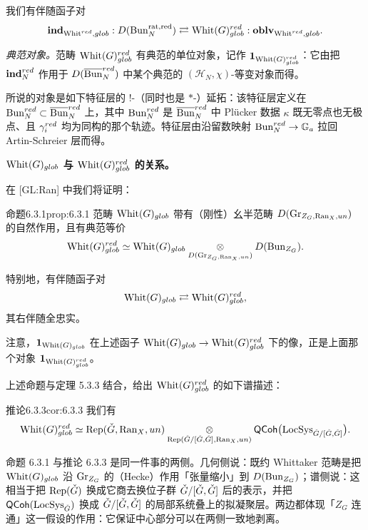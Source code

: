 我们有伴随函子对
\[
  \mathbf{ind}_{\mathrm{Whit}^{red},glob} : D(\operatorname{Bun}^{\mathrm{rat},\mathrm{red}}_N)
  \rightleftarrows \mathrm{Whit}(G)^{red}_{glob} : \mathbf{oblv}_{\mathrm{Whit}^{red},glob}.
\]

\emph{典范对象。}范畴 $\mathrm{Whit}(G)^{red}_{glob}$ 有典范的单位对象，记作 $\mathbf{1}_{\mathrm{Whit}(G)^{red}_{glob}}$：它由把 $\mathbf{ind}^{red}_N$ 作用于 $D(\overline{\operatorname{Bun}}^{red}_N)$ 中某个典范的 $(\mathcal H_N,\chi)$-等变对象而得。

所说的对象是如下特征层的 $!$-（同时也是 $\ast$-）延拓：该特征层定义在 $\operatorname{Bun}^{red}_N\subset\overline{\operatorname{Bun}}^{red}_N$ 上，其中 $\operatorname{Bun}^{red}_N$ 是 $\overline{\operatorname{Bun}}^{red}_N$ 中 Plücker 数据 $\kappa$ 既无零点也无极点、且 $\gamma_i^{red}$ 均为同构的那个轨迹。特征层由沿留数映射 $\operatorname{Bun}^{red}_N\to\mathbb{G}_a$ 拉回 Artin-Schreier 层而得。

\textbf{$\mathrm{Whit}(G)_{glob}$ 与 $\mathrm{Whit}(G)^{red}_{glob}$ 的关系。}

在 [GL:Ran] 中我们将证明：

\begin{othm}{命题}{6.3.1}{prop:6.3.1}
范畴 $\mathrm{Whit}(G)_{glob}$ 带有（刚性）幺半范畴 $D(\operatorname{Gr}_{Z_G,\mathrm{Ran}_X,un})$ 的自然作用，且有典范等价
\[
  \mathrm{Whit}(G)^{red}_{glob}\simeq
  \mathrm{Whit}(G)_{glob}\underset{D(\operatorname{Gr}_{Z_G,\mathrm{Ran}_X,un})}{\otimes} D(\operatorname{Bun}_{Z_G}).
\]
\end{othm}

特别地，有伴随函子对
\[
  \mathrm{Whit}(G)_{glob}\rightleftarrows\mathrm{Whit}(G)^{red}_{glob},
\]
其右伴随全忠实。

注意，$\mathbf{1}_{\mathrm{Whit}(G)_{glob}}$ 在上述函子 $\mathrm{Whit}(G)_{glob}\to\mathrm{Whit}(G)^{red}_{glob}$ 下的像，正是上面那个对象 $\mathbf{1}_{\mathrm{Whit}(G)^{red}_{glob}}$。

上述命题与定理 5.3.3 结合，给出 $\mathrm{Whit}(G)^{red}_{glob}$ 的如下谱描述：

\begin{othm}{推论}{6.3.3}{cor:6.3.3}
我们有
\[
  \mathrm{Whit}(G)^{red}_{glob}\simeq
  \operatorname{Rep}(\check G,\mathrm{Ran}_X,un)
  \underset{\operatorname{Rep}(\check G/[\check G,\check G],\mathrm{Ran}_X,un)}{\otimes}
  \mathsf{QCoh}\bigl(\operatorname{LocSys}_{\check G/[\check G,\check G]}\bigr).
\]
\end{othm}

\begin{annote}
命题 6.3.1 与推论 6.3.3 是同一件事的两侧。几何侧说：既约 Whittaker 范畴是把 $\mathrm{Whit}(G)_{glob}$ 沿 $\operatorname{Gr}_{Z_G}$ 的（Hecke）作用「张量缩小」到 $D(\operatorname{Bun}_{Z_G})$；谱侧说：这相当于把 $\operatorname{Rep}(\check G)$ 换成它商去换位子群 $\check G/[\check G,\check G]$ 后的表示，并把 $\mathsf{QCoh}(\operatorname{LocSys}_{\check G})$ 换成 $\check G/[\check G,\check G]$ 的局部系统叠上的拟凝聚层。两边都体现「$Z_G$ 连通」这一假设的作用：它保证中心部分可以在两侧一致地剥离。\par\vspace{0.15em}{\raggedleft 【来源：原书 p.11 §6.3--6.3.2（A）】\par}
\end{annote}
